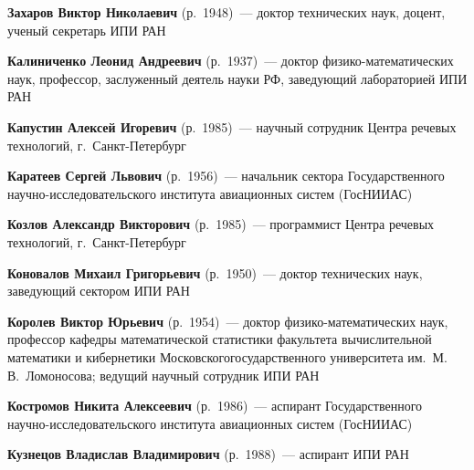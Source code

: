 \begin{multicols}{2}
\vspace*{6pt}

\noindent
\textbf{Захаров Виктор Николаевич} (р.\ 1948)~--- 
доктор технических наук, доцент, ученый секретарь ИПИ РАН

\vspace*{6pt}

\noindent
\textbf{Калиниченко Леонид Андреевич} (р.\ 1937)~--- 
доктор фи\-зи\-ко-математических  наук, профессор, 
заслуженный деятель науки РФ, за\-ве\-ду\-ющий лабораторией ИПИ РАН

\vspace*{6pt}

\noindent
\textbf{Капустин Алексей Игоревич} (р.\ 1985)~--- научный сотрудник Центра речевых технологий, 
г.~Санкт-Пе\-тер\-бург

\vspace*{6pt}

\noindent
\textbf{Каратеев Сергей Львович} (р.\ 1956)~--- начальник сектора 
Государственного научно-исследовательского института авиационных систем (ГосНИИАС)

\vspace*{6pt}

\noindent
\textbf{Козлов Александр Викторович} (р.\ 1985)~--- программист Центра речевых технологий, 
г.~Санкт-Пе\-тер\-бург
\columnbreak


\noindent
\textbf{Коновалов Михаил Григорьевич} (р.\ 1950)~--- доктор технических наук, заведующий
сектором ИПИ РАН

\vspace*{4pt}

\noindent
\textbf{Королев Виктор Юрьевич} (р.\ 1954)~--- доктор фи\-зи\-ко-ма\-те\-ма\-ти\-че\-ских наук, 
профессор кафедры математической статистики факультета вычислительной математики и кибернетики 
Московского\linebreak государственного университета им.~М.\,В.~Ломоносова;
ведущий научный сотрудник ИПИ РАН

\vspace*{4pt}

\noindent
\textbf{Костромов Никита Алексеевич} (р.\ 1986)~--- аспирант Государственного 
научно-исследовательского института авиационных систем (ГосНИИАС)

\vspace*{4pt}


\noindent
\textbf{Кузнецов Владислав Владимирович} (р.\ 1988)~--- аспирант ИПИ РАН 


\end{multicols}
